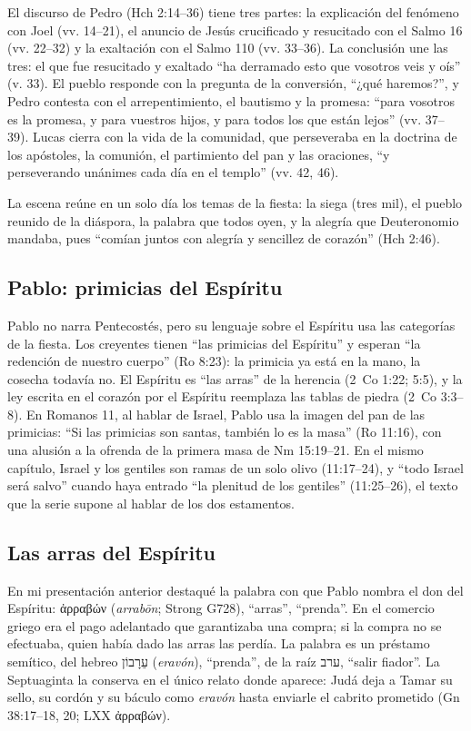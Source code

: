 \documentclass[11pt,letterpaper]{article}
\newcommand{\heb}[1]{\mbox{\foreignlanguage{hebrew}{#1}}}
\newcommand{\grc}[1]{\foreignlanguage{ancientgreek}{#1}}
\begin{document}
El discurso de Pedro (Hch 2:14--36) tiene tres partes: la explicación del fenómeno con Joel (vv. 14--21), el anuncio de Jesús crucificado y resucitado con el Salmo 16 (vv. 22--32) y la exaltación con el Salmo 110 (vv. 33--36). La conclusión une las tres: el que fue resucitado y exaltado ``ha derramado esto que vosotros veis y oís'' (v. 33). El pueblo responde con la pregunta de la conversión, ``¿qué haremos?'', y Pedro contesta con el arrepentimiento, el bautismo y la promesa: ``para vosotros es la promesa, y para vuestros hijos, y para todos los que están lejos'' (vv. 37--39). Lucas cierra con la vida de la comunidad, que perseveraba en la doctrina de los apóstoles, la comunión, el partimiento del pan y las oraciones, ``y perseverando unánimes cada día en el templo'' (vv. 42, 46).

La escena reúne en un solo día los temas de la fiesta: la siega (tres mil), el pueblo reunido de la diáspora, la palabra que todos oyen, y la alegría que Deuteronomio mandaba, pues ``comían juntos con alegría y sencillez de corazón'' (Hch 2:46).

\subsection{Pablo: primicias del Espíritu}

Pablo no narra Pentecostés, pero su lenguaje sobre el Espíritu usa las categorías de la fiesta. Los creyentes tienen ``las primicias del Espíritu'' y esperan ``la redención de nuestro cuerpo'' (Ro 8:23): la primicia ya está en la mano, la cosecha todavía no. El Espíritu es ``las arras'' de la herencia (2~Co 1:22; 5:5), y la ley escrita en el corazón por el Espíritu reemplaza las tablas de piedra (2~Co 3:3--8). En Romanos 11, al hablar de Israel, Pablo usa la imagen del pan de las primicias: ``Si las primicias son santas, también lo es la masa'' (Ro 11:16), con una alusión a la ofrenda de la primera masa de Nm 15:19--21. En el mismo capítulo, Israel y los gentiles son ramas de un solo olivo (11:17--24), y ``todo Israel será salvo'' cuando haya entrado ``la plenitud de los gentiles'' (11:25--26), el texto que la serie supone al hablar de los dos estamentos.

\subsection{Las arras del Espíritu}

En mi presentación anterior destaqué la palabra con que Pablo nombra el don del Espíritu: \grc{ἀρραβών} (\emph{arrabōn}; Strong G728), ``arras'', ``prenda''. En el comercio griego era el pago adelantado que garantizaba una compra; si la compra no se efectuaba, quien había dado las arras las perdía. La palabra es un préstamo semítico, del hebreo \heb{עֵרָבוֹן} (\emph{eravón}), ``prenda'', de la raíz \heb{ערב}, ``salir fiador''. La Septuaginta la conserva en el único relato donde aparece: Judá deja a Tamar su sello, su cordón y su báculo como \emph{eravón} hasta enviarle el cabrito prometido (Gn 38:17--18, 20; LXX \grc{ἀρραβών}).
\end{document}
